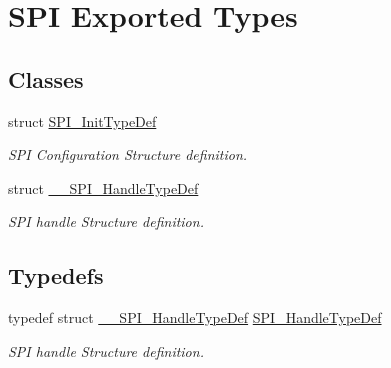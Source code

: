 \hypertarget{group___s_p_i___exported___types}{}\section{S\+PI Exported Types}
\label{group___s_p_i___exported___types}
\subsection*{Classes}
\begin{DoxyCompactItemize}
\item 
struct \hyperlink{struct_s_p_i___init_type_def}{S\+P\+I\+\_\+\+Init\+Type\+Def}
\begin{DoxyCompactList}\small\item\em S\+PI Configuration Structure definition. \end{DoxyCompactList}\item 
struct \hyperlink{struct_____s_p_i___handle_type_def}{\+\_\+\+\_\+\+S\+P\+I\+\_\+\+Handle\+Type\+Def}
\begin{DoxyCompactList}\small\item\em S\+PI handle Structure definition. \end{DoxyCompactList}\end{DoxyCompactItemize}
\subsection*{Typedefs}
\begin{DoxyCompactItemize}
\item 
typedef struct \hyperlink{struct_____s_p_i___handle_type_def}{\+\_\+\+\_\+\+S\+P\+I\+\_\+\+Handle\+Type\+Def} \hyperlink{group___s_p_i___exported___types_gab633e49dd034de2f3a1fe79853d78d18}{S\+P\+I\+\_\+\+Handle\+Type\+Def}\hypertarget{group___s_p_i___exported___types_gab633e49dd034de2f3a1fe79853d78d18}{}\label{group___s_p_i___exported___types_gab633e49dd034de2f3a1fe79853d78d18}

\begin{DoxyCompactList}\small\item\em S\+PI handle Structure definition. \end{DoxyCompactList}\end{DoxyCompactItemize}
